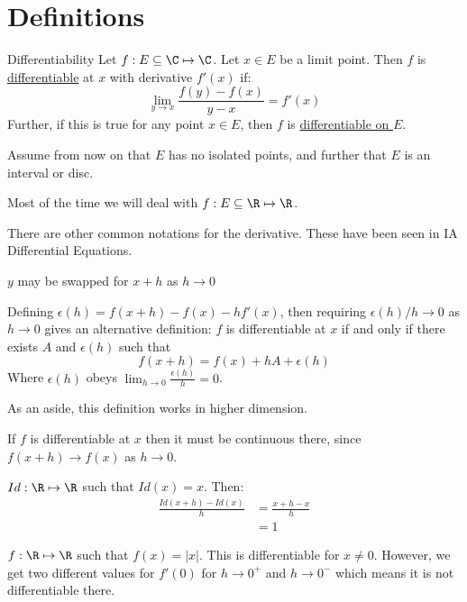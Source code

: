 \documentclass[../Main.tex]{subfiles}
\begin{document}
\section{Definitions}
\begin{definition}{Differentiability}
    Let $f : E \subseteq \C \mapsto \C$. Let $x \in E$ be a limit point. Then $f$ is \underline{differentiable} at $x$ with derivative $f'(x)$ if:
    \begin{equation}
        \lim_{y \to x} \frac{f(y) - f(x)}{y - x} = f'(x)
        \label{eqnDifferentiability}
    \end{equation}
    Further, if this is true for any point $x \in E$, then $f$ is \underline{differentiable on $E$}.
\end{definition}
Assume from now on that $E$ has no isolated points, and further that $E$ is an interval or disc.\par
\begin{remarks}
    \item Most of the time we will deal with $f : E \subseteq \R \mapsto \R$.
    \item There are other common notations for the derivative. These have been seen in IA Differential Equations.
    \item $y$ may be swapped for $x + h$ as $h \to 0$
    \item Defining $\epsilon(h) = f(x + h) - f(x) - hf'(x)$, then requiring $\epsilon(h) / h \to 0$ as $h \to 0$ gives an alternative definition:
        $f$ is differentiable at $x$ if and only if there exists $A$ and $\epsilon(h)$ such that
        \begin{equation*}
            f(x + h) = f(x) + hA + \epsilon(h)
        \end{equation*}
        Where $\epsilon(h)$ obeys $\lim_{h \to 0} \frac{\epsilon(h)}{h} = 0$.\par
        As an aside, this definition works in higher dimension.
    \item If $f$ is differentiable at $x$ then it must be continuous there, since $f(x + h) \to f(x)$ as $h \to 0$.
\end{remarks}
\begin{examples}{}
    \item $Id : \R \mapsto \R$ such that $Id(x) = x$. Then:
        \begin{align*}
            \frac{Id(x + h) - Id(x)}{h} &= \frac{x + h - x}{h} \\
            &= 1
        \end{align*}
    \item $f : \R \mapsto \R$ such that $f(x) = |x|$. This is differentiable for $x \neq 0$. However, we get two different values for $f'(0)$ for $h \to 0^+$ and $h \to 0^-$ which means it is not differentiable there.
\end{examples}
\end{document}
